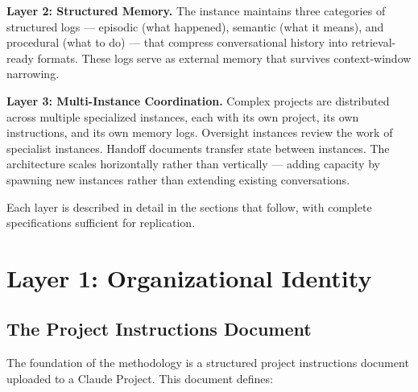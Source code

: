 \documentclass[11pt,a4paper]{article}
\begin{document}
\textbf{Layer 2: Structured Memory.} The instance maintains three categories of structured logs --- episodic (what happened), semantic (what it means), and procedural (what to do) --- that compress conversational history into retrieval-ready formats. These logs serve as external memory that survives context-window narrowing.

\textbf{Layer 3: Multi-Instance Coordination.} Complex projects are distributed across multiple specialized instances, each with its own project, its own instructions, and its own memory logs. Oversight instances review the work of specialist instances. Handoff documents transfer state between instances. The architecture scales horizontally rather than vertically --- adding capacity by spawning new instances rather than extending existing conversations.

Each layer is described in detail in the sections that follow, with complete specifications sufficient for replication.


\section{Layer 1: Organizational Identity}

\subsection{The Project Instructions Document}

The foundation of the methodology is a structured project instructions document uploaded to a Claude Project. This document defines:
\end{document}
